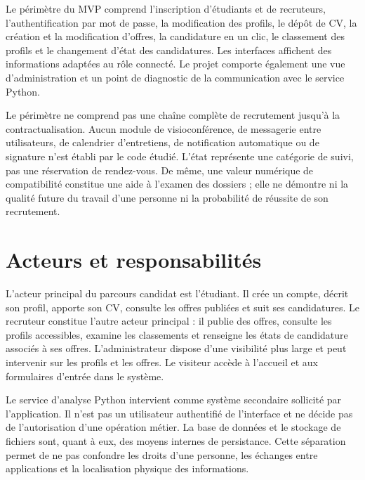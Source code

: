 Le périmètre du MVP comprend l'inscription d'étudiants et de recruteurs, l'authentification par mot de passe, la modification des profils, le dépôt de CV, la création et la modification d'offres, la candidature en un clic, le classement des profils et le changement d'état des candidatures. Les interfaces affichent des informations adaptées au rôle connecté. Le projet comporte également une vue d'administration et un point de diagnostic de la communication avec le service Python.

Le périmètre ne comprend pas une chaîne complète de recrutement jusqu'à la contractualisation. Aucun module de visioconférence, de messagerie entre utilisateurs, de calendrier d'entretiens, de notification automatique ou de signature n'est établi par le code étudié. L'état  représente une catégorie de suivi, pas une réservation de rendez-vous. De même, une valeur numérique de compatibilité constitue une aide à l'examen des dossiers ; elle ne démontre ni la qualité future du travail d'une personne ni la probabilité de réussite de son recrutement.

\section{Acteurs et responsabilités}

L'acteur principal du parcours candidat est l'étudiant. Il crée un compte, décrit son profil, apporte son CV, consulte les offres publiées et suit ses candidatures. Le recruteur constitue l'autre acteur principal : il publie des offres, consulte les profils accessibles, examine les classements et renseigne les états de candidature associés à ses offres. L'administrateur dispose d'une visibilité plus large et peut intervenir sur les profils et les offres. Le visiteur accède à l'accueil et aux formulaires d'entrée dans le système.

Le service d'analyse Python intervient comme système secondaire sollicité par l'application. Il n'est pas un utilisateur authentifié de l'interface et ne décide pas de l'autorisation d'une opération métier. La base de données et le stockage de fichiers sont, quant à eux, des moyens internes de persistance. Cette séparation permet de ne pas confondre les droits d'une personne, les échanges entre applications et la localisation physique des informations.

